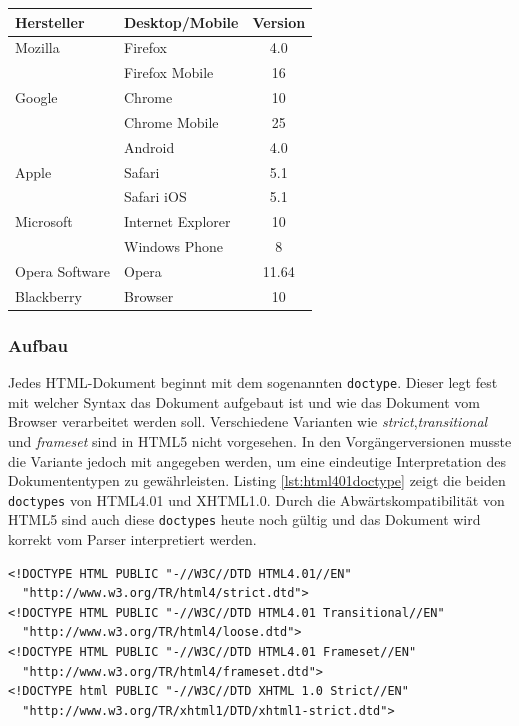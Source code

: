 \vspace{1em}
\begin{center}
  \begin{tabular}{ | l | l | c | }
    \hline
    \textbf{Hersteller} & \textbf{Desktop/Mobile} & \textbf{Version} \\ \hline \hline
    Mozilla & Firefox & 4.0\\
	\hline
	& Firefox Mobile & 16\\
	\hline
	Google & Chrome & 10\\
	\hline
	& Chrome Mobile & 25\\
	\hline
	& Android & 4.0\\
	\hline
	Apple & Safari & 5.1\\
	\hline
	& Safari iOS & 5.1\\
	\hline
	Microsoft & Internet Explorer & 10\\
	\hline
	& Windows Phone & 8\\
	\hline
	Opera Software & Opera & 11.64\\
	\hline
	Blackberry & Browser & 10\\
    \hline
  \end{tabular}
\label{tab:html5browserkomp}
\end{center}

\subsubsection{Aufbau} Jedes HTML-Dokument beginnt mit dem sogenannten \texttt{doctype}. Dieser legt fest mit welcher Syntax das Dokument aufgebaut ist und wie das Dokument vom Browser verarbeitet werden soll. Verschiedene Varianten wie \textit{strict},\textit{transitional} und \textit{frameset} sind in HTML5 nicht vorgesehen. In den Vorgängerversionen musste die Variante jedoch mit angegeben werden, um eine eindeutige Interpretation des Dokumententypen zu gewährleisten. Listing \ref{lst:html401doctype} zeigt die beiden \texttt{doctypes} von HTML4.01 und XHTML1.0. Durch die Abwärtskompatibilität von HTML5 sind auch diese \texttt{doctypes} heute noch gültig und das Dokument wird korrekt vom Parser interpretiert werden.
    
\vspace{1em}
\begin{lstlisting}[language=HTML5, caption=(X)HTML4.01 \texttt{doctype}-Element, label=lst:html401doctype]
<!DOCTYPE HTML PUBLIC "-//W3C//DTD HTML4.01//EN"
  "http://www.w3.org/TR/html4/strict.dtd">
<!DOCTYPE HTML PUBLIC "-//W3C//DTD HTML4.01 Transitional//EN"
  "http://www.w3.org/TR/html4/loose.dtd">
<!DOCTYPE HTML PUBLIC "-//W3C//DTD HTML4.01 Frameset//EN"
  "http://www.w3.org/TR/html4/frameset.dtd">        
<!DOCTYPE html PUBLIC "-//W3C//DTD XHTML 1.0 Strict//EN"
  "http://www.w3.org/TR/xhtml1/DTD/xhtml1-strict.dtd">    
\end{lstlisting}
	
